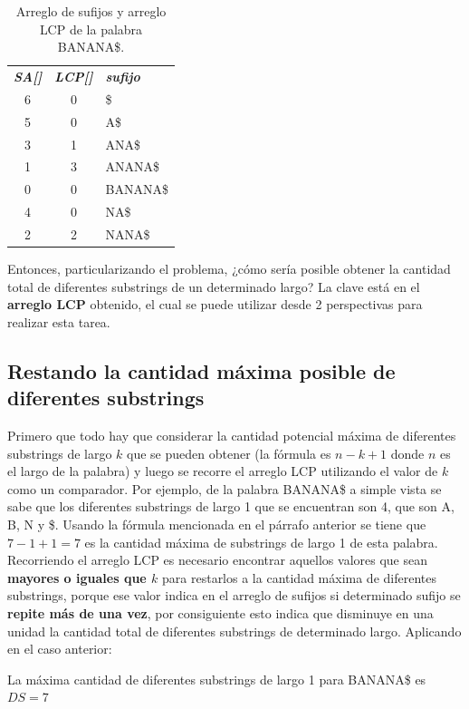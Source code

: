 \begin{table}[H]
	\centering
	\label{propuesta-1}
	\begin{tabular}{c c l}
		\textit{\textbf{SA[]}} & \textit{\textbf{LCP[]}} &\textit{\textbf{sufijo}}\\
		6 & 0 & \$\\
		5 & 0 & A\$\\
		3 & 1 & ANA\$\\
		1 & 3 & ANANA\$\\
		0 & 0 & BANANA\$\\
		4 & 0 & NA\$\\
		2 & 2 & NANA\$\\
	\end{tabular}
\caption{Arreglo de sufijos y arreglo LCP de la palabra BANANA\$.}
\end{table}

Entonces, particularizando el problema, ¿cómo sería posible obtener la cantidad total de diferentes substrings de un determinado largo? La clave está en el \textbf{arreglo LCP} obtenido, el cual se puede utilizar desde 2 perspectivas para realizar esta tarea.

\subsection{Restando la cantidad máxima posible de diferentes substrings}

Primero que todo hay que considerar la cantidad potencial máxima de diferentes substrings de largo $k$ que se pueden obtener (la fórmula es $n-k+1$ donde $n$ es el largo de la palabra) y luego se recorre el arreglo LCP utilizando el valor de $k$ como un comparador.
Por ejemplo, de la palabra BANANA\$ a simple vista se sabe que los diferentes substrings de largo 1 que se encuentran son 4, que son A, B, N y \$. Usando la fórmula mencionada en el párrafo anterior se tiene que $7-1+1=7$ es la cantidad máxima de substrings de largo 1 de esta palabra. Recorriendo el arreglo LCP es necesario encontrar aquellos valores que sean \textbf{mayores o iguales que $k$} para restarlos a la cantidad máxima de diferentes substrings, porque ese valor indica en el arreglo de sufijos si determinado sufijo se \textbf{repite más de una vez}, por consiguiente esto indica que disminuye en una unidad la cantidad total de diferentes substrings de determinado largo. Aplicando en el caso anterior:

La máxima cantidad de diferentes substrings de largo 1 para BANANA\$ es $DS = 7$

